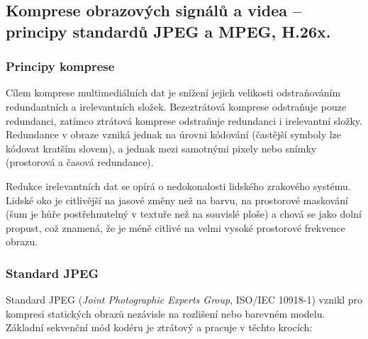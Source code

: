 \subsection{Komprese obrazových signálů a videa – principy standardů JPEG a MPEG, H.26x.}
    \subsubsection{Principy komprese}
        Cílem komprese multimediálních dat je snížení jejich velikosti odstraňováním redundantních a irelevantních složek. Bezeztrátová komprese odstraňuje pouze redundanci, zatímco ztrátová komprese odstraňuje redundanci i irelevantní složky. Redundance v obraze vzniká jednak na úrovni kódování (častější symboly lze kódovat kratším slovem), a jednak mezi samotnými pixely nebo snímky (prostorová a časová redundance). 
        
        Redukce irelevantních dat se opírá o nedokonalosti lidského zrakového systému. Lidské oko je citlivější na jasové změny než na barvu, na prostorové maskování (šum je hůře postřehnutelný v textuře než na souvislé ploše) a chová se jako dolní propust, což znamená, že je méně citlivé na velmi vysoké prostorové frekvence obrazu.
    \subsubsection{Standard JPEG}
        Standard JPEG (\textit{Joint Photographic Experts Group}, ISO/IEC 10918-1) vznikl pro kompresi statických obrazů nezávisle na rozlišení nebo barevném modelu. Základní sekvenční mód kodéru je ztrátový a pracuje v těchto krocích:
        
